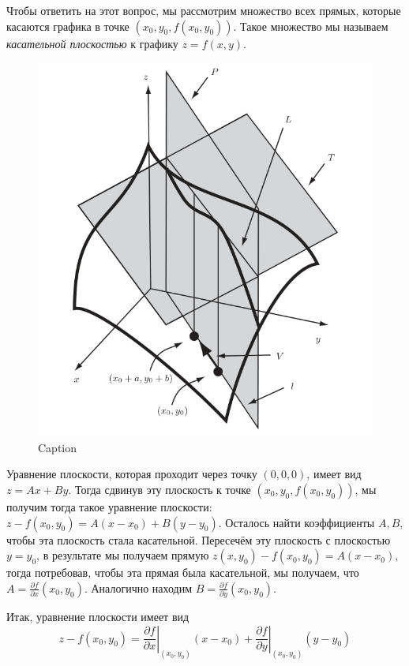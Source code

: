 Чтобы ответить на этот вопрос, мы рассмотрим множество всех прямых, которые касаются графика в точке $(x_0, y_0, f(x_0,y_0))$. Такое множество мы называем \textit{касательной плоскостью} к графику $z = f(x,y).$

\begin{figure}[h!]
    \centering
    \includegraphics[scale =0.7]{images/direction_der2.jpg}
    \caption{Caption}
    \label{fig:enter-label}
\end{figure}

Уравнение плоскости, которая проходит через точку $(0,0,0)$, имеет вид $z = Ax + By$. Тогда сдвинув эту плоскость к точке $(x_0, y_0, f(x_0,y_0))$, мы получим тогда такое уравнение плоскости: $z - f(x_0,y_0) = A(x-x_0) + B(y-y_0)$. Осталось найти коэффициенты $A,B$, чтобы эта плоскость стала касательной. Пересечём эту плоскость с плоскостью $y=y_0$, в результате мы получаем прямую $z(x, y_0) - f(x_0,y_0) = A(x-x_0)$, тогда потребовав, чтобы эта прямая была касательной, мы получаем, что $A = \frac{\partial f}{\partial x}(x_0,y_0)$. Аналогично находим $B = \frac{\partial f}{\partial y}(x_0,y_0)$.

Итак, уравнение плоскости имеет вид
\[
z - f(x_0,y_0) = \left.\frac{\partial f}{\partial x}\right|_{(x_0,y_0)} (x-x_0) + \left.\frac{\partial f}{\partial y}\right|_{(x_0,y_0)} (y-y_0)
\]

